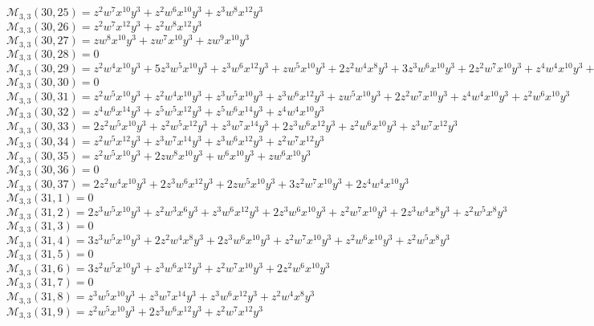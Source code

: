 \documentclass[12pt]{memoireuqam1.3}
\begin{document}
$\mathcal{M}_{3,3}(30,25)=z^2w^7x^{10}y^3+z^2w^6x^{10}y^3+z^3w^8x^{12}y^3$\\
$\mathcal{M}_{3,3}(30,26)=z^2w^7x^{12}y^3+z^2w^8x^{12}y^3$\\
$\mathcal{M}_{3,3}(30,27)=zw^8x^{10}y^3+zw^7x^{10}y^3+zw^9x^{10}y^3$\\
$\mathcal{M}_{3,3}(30,28)=0$\\
$\mathcal{M}_{3,3}(30,29)=z^2w^4x^{10}y^3+5z^3w^5x^{10}y^3+z^3w^6x^{12}y^3+zw^5x^{10}y^3+2z^2w^4x^8y^3+3z^3w^6x^{10}y^3+2z^2w^7x^{10}y^3+z^4w^4x^{10}y^3+z^2w^5x^8y^3$\\
$\mathcal{M}_{3,3}(30,30)=0$\\
$\mathcal{M}_{3,3}(30,31)=z^2w^5x^{10}y^3+z^2w^4x^{10}y^3+z^3w^5x^{10}y^3+z^3w^6x^{12}y^3+zw^5x^{10}y^3+2z^2w^7x^{10}y^3+z^4w^4x^{10}y^3+z^2w^6x^{10}y^3$\\
$\mathcal{M}_{3,3}(30,32)=z^4w^6x^{14}y^3+z^5w^5x^{12}y^3+z^5w^6x^{14}y^3+z^4w^4x^{10}y^3$\\
$\mathcal{M}_{3,3}(30,33)=2z^2w^5x^{10}y^3+z^2w^5x^{12}y^3+z^3w^7x^{14}y^3+2z^3w^6x^{12}y^3+z^2w^6x^{10}y^3+z^3w^7x^{12}y^3$\\
$\mathcal{M}_{3,3}(30,34)=z^2w^5x^{12}y^3+z^3w^7x^{14}y^3+z^3w^6x^{12}y^3+z^2w^7x^{12}y^3$\\
$\mathcal{M}_{3,3}(30,35)=z^2w^5x^{10}y^3+2zw^8x^{10}y^3+w^6x^{10}y^3+zw^6x^{10}y^3$\\
$\mathcal{M}_{3,3}(30,36)=0$\\
$\mathcal{M}_{3,3}(30,37)=2z^2w^4x^{10}y^3+2z^3w^6x^{12}y^3+2zw^5x^{10}y^3+3z^2w^7x^{10}y^3+2z^4w^4x^{10}y^3$\\
$\mathcal{M}_{3,3}(31,1)=0$\\
$\mathcal{M}_{3,3}(31,2)=2z^3w^5x^{10}y^3+z^2w^3x^6y^3+z^3w^6x^{12}y^3+2z^3w^6x^{10}y^3+z^2w^7x^{10}y^3+2z^3w^4x^8y^3+z^2w^5x^8y^3$\\
$\mathcal{M}_{3,3}(31,3)=0$\\
$\mathcal{M}_{3,3}(31,4)=3z^3w^5x^{10}y^3+2z^2w^4x^8y^3+2z^3w^6x^{10}y^3+z^2w^7x^{10}y^3+z^2w^6x^{10}y^3+z^2w^5x^8y^3$\\
$\mathcal{M}_{3,3}(31,5)=0$\\
$\mathcal{M}_{3,3}(31,6)=3z^2w^5x^{10}y^3+z^3w^6x^{12}y^3+z^2w^7x^{10}y^3+2z^2w^6x^{10}y^3$\\
$\mathcal{M}_{3,3}(31,7)=0$\\
$\mathcal{M}_{3,3}(31,8)=z^3w^5x^{10}y^3+z^3w^7x^{14}y^3+z^3w^6x^{12}y^3+z^2w^4x^8y^3$\\
$\mathcal{M}_{3,3}(31,9)=z^2w^5x^{10}y^3+2z^3w^6x^{12}y^3+z^2w^7x^{12}y^3$\\
\end{document}
